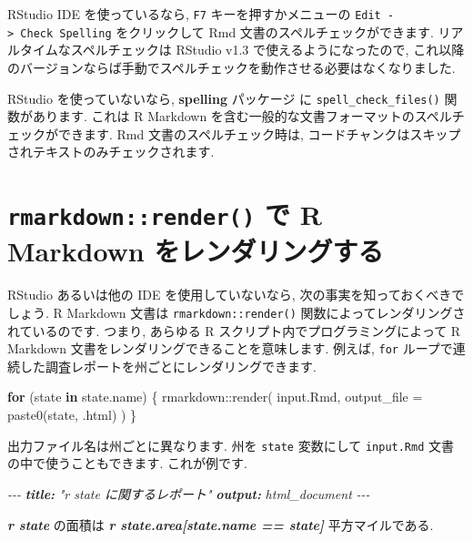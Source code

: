 \documentclass[
  11pt,
  lualatex,ja=standard,jafont=noto]{bxjsreport}
\newenvironment{Shaded}{\begin{snugshade}}{\end{snugshade}}
\newcommand{\AnnotationTok}[1]{\textcolor[rgb]{0.56,0.35,0.01}{\textbf{\textit{#1}}}}
\newcommand{\AttributeTok}[1]{\textcolor[rgb]{0.77,0.63,0.00}{#1}}
\newcommand{\CommentTok}[1]{\textcolor[rgb]{0.56,0.35,0.01}{\textit{#1}}}
\newcommand{\ControlFlowTok}[1]{\textcolor[rgb]{0.13,0.29,0.53}{\textbf{#1}}}
\newcommand{\FunctionTok}[1]{\textcolor[rgb]{0.00,0.00,0.00}{#1}}
\newcommand{\InformationTok}[1]{\textcolor[rgb]{0.56,0.35,0.01}{\textbf{\textit{#1}}}}
\newcommand{\NormalTok}[1]{#1}
\newcommand{\SpecialCharTok}[1]{\textcolor[rgb]{0.00,0.00,0.00}{#1}}
\newcommand{\StringTok}[1]{\textcolor[rgb]{0.31,0.60,0.02}{#1}}
\begin{document}
RStudio IDE を使っているなら, \texttt{F7} キーを押すかメニューの \texttt{Edit -\textgreater{}\ Check\ Spelling} をクリックして Rmd 文書のスペルチェックができます. リアルタイムなスペルチェックは RStudio v1.3 で使えるようになったので, これ以降のバージョンならば手動でスペルチェックを動作させる必要はなくなりました.

RStudio を使っていないなら, \textbf{spelling} パッケージ \autocite{R-spelling} に \texttt{spell\_check\_files()} 関数があります. これは R Markdown を含む一般的な文書フォーマットのスペルチェックができます. Rmd 文書のスペルチェック時は, コードチャンクはスキップされテキストのみチェックされます.

\hypertarget{rmarkdown-render}{%
\section{\texorpdfstring{\texttt{rmarkdown::render()} で R Markdown をレンダリングする}{rmarkdown::render() で R Markdown をレンダリングする}}\label{rmarkdown-render}}

RStudio あるいは他の IDE を使用していないなら, 次の事実を知っておくべきでしょう. R Markdown 文書は \texttt{rmarkdown::render()} 関数によってレンダリングされているのです. つまり, あらゆる R スクリプト内でプログラミングによって R Markdown 文書をレンダリングできることを意味します. 例えば, \texttt{for} ループで連続した調査レポートを州ごとにレンダリングできます.

\begin{Shaded}
\begin{Highlighting}[numbers=left,,]
\ControlFlowTok{for}\NormalTok{ (state }\ControlFlowTok{in}\NormalTok{ state.name) \{}
\NormalTok{  rmarkdown}\SpecialCharTok{::}\FunctionTok{render}\NormalTok{(}
    \StringTok{\textquotesingle{}input.Rmd\textquotesingle{}}\NormalTok{, }\AttributeTok{output\_file =} \FunctionTok{paste0}\NormalTok{(state, }\StringTok{\textquotesingle{}.html\textquotesingle{}}\NormalTok{)}
\NormalTok{  )}
\NormalTok{\}}
\end{Highlighting}
\end{Shaded}

出力ファイル名は州ごとに異なります. 州を \texttt{state} 変数にして \texttt{input.Rmd} 文書の中で使うこともできます. これが例です.

\begin{Shaded}
\begin{Highlighting}[]
\CommentTok{{-}{-}{-}}
\AnnotationTok{title:}\CommentTok{ "\textasciigrave{}r state\textasciigrave{} に関するレポート"}
\AnnotationTok{output:}\CommentTok{ html\_document}
\CommentTok{{-}{-}{-}}

\InformationTok{\textasciigrave{}r state\textasciigrave{}}\NormalTok{ の面積は }\InformationTok{\textasciigrave{}r state.area[state.name == state]\textasciigrave{}}\NormalTok{ 平方マイルである.}
\end{Highlighting}
\end{Shaded}
\end{document}
